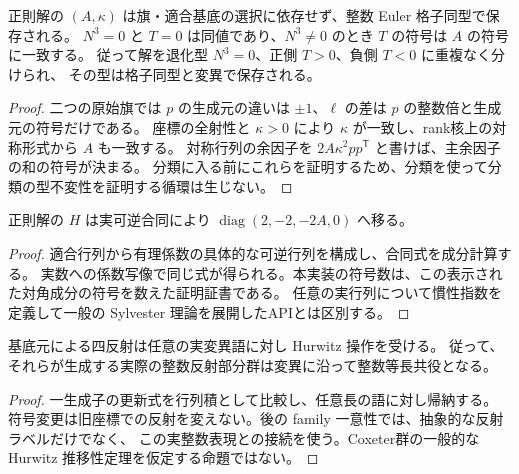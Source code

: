 \begin{theorem}[内在量と三型の分離]\label{bp:intrinsic-kind}
\leanok
{}
正則解の $(A,\kappa)$ は旗・適合基底の選択に依存せず、整数 Euler 格子同型で保存される。
$N^3=0$ と $T=0$ は同値であり、$N^3\ne0$ のとき $T$ の符号は $A$ の符号に一致する。
従って解を退化型 $N^3=0$、正側 $T>0$、負側 $T<0$ に重複なく分けられ、
その型は格子同型と変異で保存される。
\end{theorem}
\begin{proof}\leanok{}
二つの原始旗では $p$ の生成元の違いは $\pm1$、$\ell$ の差は $p$ の整数倍と生成元の符号だけである。
座標の全射性と $\kappa>0$ により $\kappa$ が一致し、rank核上の対称形式から $A$ も一致する。
対称行列の余因子を $2A\kappa^2pp^{\mathsf T}$ と書けば、主余因子の和の符号が決まる。
分類に入る前にこれらを証明するため、分類を使って分類の型不変性を証明する循環は生じない。
\end{proof}

\begin{proposition}[実対角合同による符号の証明証書]\label{bp:intrinsic-diagonal}
\leanok
{}
正則解の $H$ は実可逆合同により $\operatorname{diag}(2,-2,-2A,0)$ へ移る。
\end{proposition}
\begin{proof}\leanok{}
適合行列から有理係数の具体的な可逆行列を構成し、合同式を成分計算する。
実数への係数写像で同じ式が得られる。本実装の符号数は、この表示された対角成分の符号を数えた証明証書である。
任意の実行列について慣性指数を定義して一般の Sylvester 理論を展開したAPIとは区別する。
\end{proof}

\begin{proposition}\label{bp:reflection-hurwitz}
\leanok
{}
基底元による四反射は任意の実変異語に対し Hurwitz 操作を受ける。
従って、それらが生成する実際の整数反射部分群は変異に沿って整数等長共役となる。
\end{proposition}
\begin{proof}\leanok{}
一生成子の更新式を行列積として比較し、任意長の語に対し帰納する。
符号変更は旧座標での反射を変えない。後の family 一意性では、抽象的な反射ラベルだけでなく、
この実整数表現との接続を使う。Coxeter群の一般的な Hurwitz 推移性定理を仮定する命題ではない。
\end{proof}
